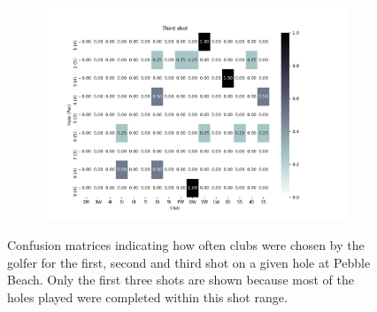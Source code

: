 \documentclass{kththesis}
\begin{document}
\begin{figure}
\begin{subfigure}{\textwidth}
    \centering
    \includegraphics[height=0.3\textheight]{L2ClubChoices/Ludvig_Pebble_Club_Choices_Third_Shot.png} 
    \end{subfigure}
    \caption{Confusion matrices indicating how often clubs were chosen by the golfer for the first, second and third shot on a given hole at Pebble Beach. Only the first three shots are shown because most of the holes played were completed within this shot range.}
    \label{fig:L2_pebble_club_choice_confusion}
\end{figure}
\end{document}
